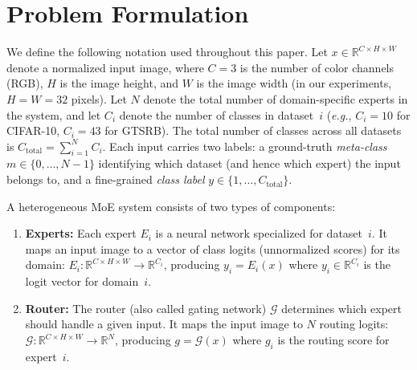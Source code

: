 \documentclass[runningheads]{llncs}
\begin{document}
\section{Problem Formulation}

We define the following notation used throughout this paper. Let $x \in \mathbb{R}^{C \times H \times W}$ denote a normalized input image, where $C = 3$ is the number of color channels (RGB), $H$ is the image height, and $W$ is the image width (in our experiments, $H = W = 32$ pixels). Let $N$ denote the total number of domain-specific experts in the system, and let $C_i$ denote the number of classes in dataset~$i$ (\emph{e.g.}, $C_i = 10$ for CIFAR-10, $C_i = 43$ for GTSRB). The total number of classes across all datasets is $C_{\text{total}} = \sum_{i=1}^{N} C_i$. Each input carries two labels: a ground-truth \emph{meta-class} $m \in \{0, \ldots, N{-}1\}$ identifying which dataset (and hence which expert) the input belongs to, and a fine-grained \emph{class label} $y \in \{1, \ldots, C_{\text{total}}\}$.

A heterogeneous MoE system consists of two types of components:

\begin{enumerate}
    \item \textbf{Experts:} Each expert $E_i$ is a neural network specialized for dataset~$i$. It maps an input image to a vector of class logits (unnormalized scores) for its domain: $E_i: \mathbb{R}^{C \times H \times W} \to \mathbb{R}^{C_i}$, producing $y_i = E_i(x)$ where $y_i \in \mathbb{R}^{C_i}$ is the logit vector for domain~$i$.
    \item \textbf{Router:} The router (also called gating network) $\mathcal{G}$ determines which expert should handle a given input. It maps the input image to $N$ routing logits: $\mathcal{G}: \mathbb{R}^{C \times H \times W} \to \mathbb{R}^N$, producing $g = \mathcal{G}(x)$ where $g_i$ is the routing score for expert~$i$.
\end{enumerate}
\end{document}

